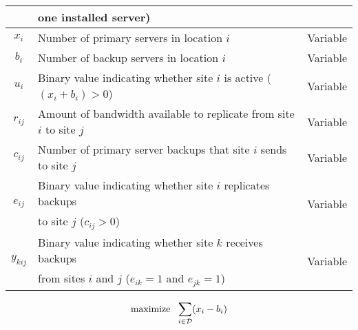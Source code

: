 \documentclass[preprint]{elsarticle}
\begin{document}
\begin{table}
\begin{center}
\begin{tabular}{|c||l||c|}
&one installed server)&\\
\hline $x_i$ & Number of primary servers in location $i$ &Variable\\
\hline $b_i$  & Number of backup servers in location $i$ &Variable\\
\hline $u_i$  &Binary value indicating whether site $i$ is active ($(x_i + b_i) > 0$) &Variable\\
\hline $r_{ij}$ &Amount of bandwidth available to replicate from site $i$ to site $j$ &Variable\\
\hline $c_{ij}$ &Number of primary server backups that site $i$ sends to site $j$ &Variable\\
\hline \multirow{2}{*}{$e_{ij}$} &Binary value indicating whether site $i$ replicates backups &\multirow{2}{*}{Variable}\\
&to site $j$ ($c_{ij} > 0$) &\\
\hline \multirow{2}{*}{$y_{kij}$} &Binary value indicating whether site $k$ receives backups &\multirow{2}{*}{Variable}\\
&from sites $i$ and $j$ ($e_{ik} = 1$ and $e_{jk} = 1$) &\\
\hline
\end{tabular}
\label{zeroRPOtab:notations}
\end{center}
\end{table}
 
\begin{equation}
\textup{maximize}\ \  \sum_{i \in \mathcal{D}} (x_i - b_i)
\label{zeroRPOlp:objective}
\end{equation}
\end{document}
